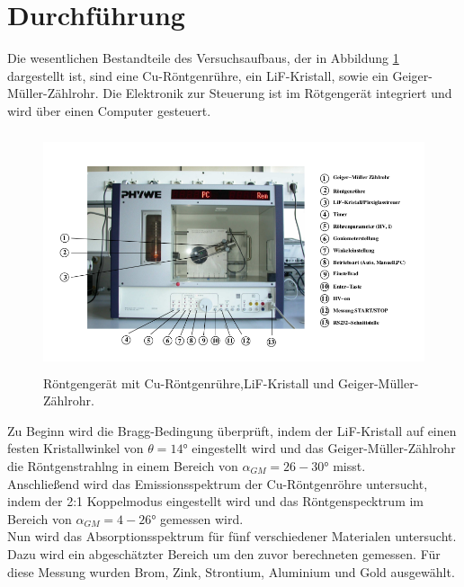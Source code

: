 \section{Durchführung}
\label{sec:Durchführung}

Die wesentlichen Bestandteile des Versuchsaufbaus, der in Abbildung
\ref{fig:aufbau} dargestellt ist, sind eine Cu-Röntgenrühre, ein
LiF-Kristall, sowie ein Geiger-Müller-Zählrohr.
Die Elektronik zur Steuerung ist im Rötgengerät integriert und
wird über einen Computer gesteuert.

\begin{figure}
  \centering
  \includegraphics[height=7cm]{aufbau.png}
  \caption{Röntgengerät mit Cu-Röntgenrühre,LiF-Kristall und Geiger-Müller-Zählrohr.}
  \label{fig:aufbau}
\end{figure}

Zu Beginn wird die Bragg-Bedingung überprüft, indem der LiF-Kristall auf einen
festen Kristallwinkel von $\theta=14°$ eingestellt wird und das Geiger-Müller-Zählrohr die
Röntgenstrahlng in einem Bereich von $\alpha_{GM}=26-30°$ misst.\\

Anschließend wird das Emissionsspektrum der Cu-Röntgenröhre untersucht, indem
der 2:1 Koppelmodus eingestellt wird und das Röntgenspecktrum im Bereich von
$\alpha_{GM}=4-26°$ gemessen wird.\\

Nun wird das Absorptionsspektrum für fünf verschiedener Materialen untersucht.
Dazu wird ein abgeschätzter Bereich um den zuvor berechneten gemessen.
Für diese Messung wurden Brom, Zink, Strontium, Aluminium und Gold ausgewählt.\\
